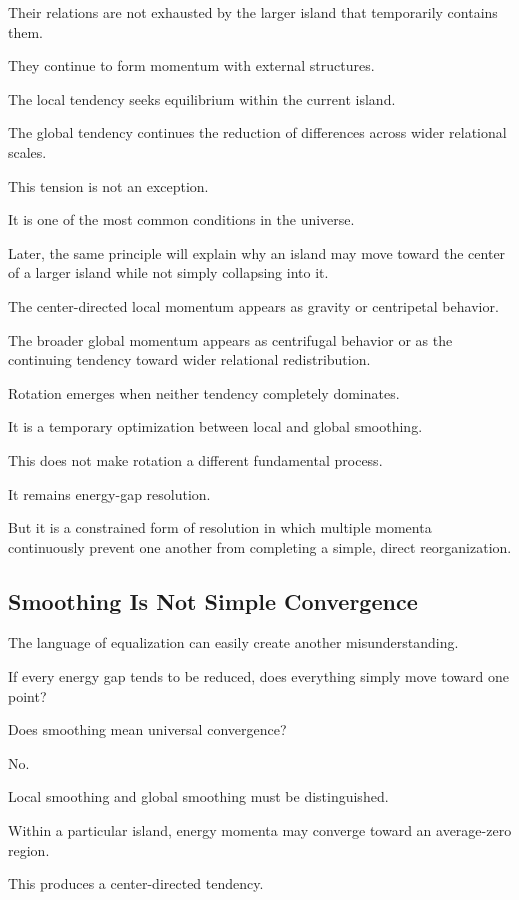 Their relations are not exhausted by the larger island that temporarily contains them.

They continue to form momentum with external structures.

The local tendency seeks equilibrium within the current island.

The global tendency continues the reduction of differences across wider relational scales.

This tension is not an exception.

It is one of the most common conditions in the universe.

Later, the same principle will explain why an island may move toward the center of a larger island while not simply collapsing into it.

The center-directed local momentum appears as gravity or centripetal behavior.

The broader global momentum appears as centrifugal behavior or as the continuing tendency toward wider relational redistribution.

Rotation emerges when neither tendency completely dominates.

It is a temporary optimization between local and global smoothing.

This does not make rotation a different fundamental process.

It remains energy-gap resolution.

But it is a constrained form of resolution in which multiple momenta continuously prevent one another from completing a simple, direct reorganization.

\subsection*{\textbf{Smoothing Is Not Simple Convergence}}

The language of equalization can easily create another misunderstanding.

If every energy gap tends to be reduced, does everything simply move toward one point?

Does smoothing mean universal convergence?

No.

Local smoothing and global smoothing must be distinguished.

Within a particular island, energy momenta may converge toward an average-zero region.

This produces a center-directed tendency.

